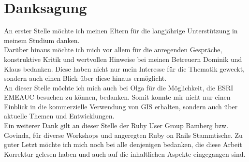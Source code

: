 \chapter*{Danksagung}
\label{ch0:Dank}

An erster Stelle möchte ich meinen Eltern für die langjährige Unterstützung in meinem Studium danken.\\
Darüber hinaus möchte ich mich vor allem für die anregenden Gespräche, konstruktive Kritik und wertvollen Hinweise bei meinen Betreuern Dominik und Klaus bedanken.
Diese haben nicht nur mein Interesse für die Thematik geweckt, sondern auch einen Blick über diese hinaus ermöglicht.\\
An dieser Stelle möchte ich mich auch bei Olga für die Möglichkeit, die ESRI EMEAUC besuchen zu können, bedanken. Somit konnte mir nicht nur einen Einblick in die kommerzielle Verwendung von GIS erhalten, sondern auch über aktuelle Themen und Entwicklungen.\\
Ein weiterer Dank gilt an dieser Stelle der Ruby User Group Bamberg bzw. Govinda, für diverse Workshops und angeregten Ruby on Rails Stammtische.
Zu guter Letzt möchte ich mich noch bei alle denjenigen bedanken, die diese Arbeit Korrektur gelesen haben und auch auf die inhaltlichen Aspekte eingegangen sind.\\

